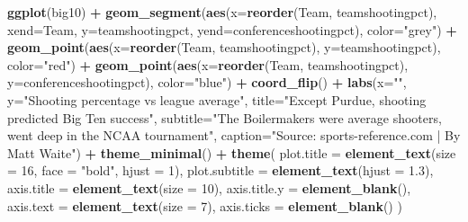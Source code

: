 \documentclass[]{book}
\newenvironment{Shaded}{\begin{snugshade}}{\end{snugshade}}
\newcommand{\KeywordTok}[1]{\textcolor[rgb]{0.13,0.29,0.53}{\textbf{#1}}}
\newcommand{\DataTypeTok}[1]{\textcolor[rgb]{0.13,0.29,0.53}{#1}}
\newcommand{\DecValTok}[1]{\textcolor[rgb]{0.00,0.00,0.81}{#1}}
\newcommand{\FloatTok}[1]{\textcolor[rgb]{0.00,0.00,0.81}{#1}}
\newcommand{\StringTok}[1]{\textcolor[rgb]{0.31,0.60,0.02}{#1}}
\newcommand{\OperatorTok}[1]{\textcolor[rgb]{0.81,0.36,0.00}{\textbf{#1}}}
\newcommand{\NormalTok}[1]{#1}
\begin{document}
\begin{Shaded}
\begin{Highlighting}[]
\KeywordTok{ggplot}\NormalTok{(big10) }\OperatorTok{+}
\StringTok{  }\KeywordTok{geom_segment}\NormalTok{(}\KeywordTok{aes}\NormalTok{(}\DataTypeTok{x=}\KeywordTok{reorder}\NormalTok{(Team, teamshootingpct), }\DataTypeTok{xend=}\NormalTok{Team, }\DataTypeTok{y=}\NormalTok{teamshootingpct, }\DataTypeTok{yend=}\NormalTok{conferenceshootingpct), }\DataTypeTok{color=}\StringTok{"grey"}\NormalTok{) }\OperatorTok{+}\StringTok{ }
\StringTok{  }\KeywordTok{geom_point}\NormalTok{(}\KeywordTok{aes}\NormalTok{(}\DataTypeTok{x=}\KeywordTok{reorder}\NormalTok{(Team, teamshootingpct), }\DataTypeTok{y=}\NormalTok{teamshootingpct), }\DataTypeTok{color=}\StringTok{"red"}\NormalTok{) }\OperatorTok{+}\StringTok{ }
\StringTok{  }\KeywordTok{geom_point}\NormalTok{(}\KeywordTok{aes}\NormalTok{(}\DataTypeTok{x=}\KeywordTok{reorder}\NormalTok{(Team, teamshootingpct), }\DataTypeTok{y=}\NormalTok{conferenceshootingpct), }\DataTypeTok{color=}\StringTok{"blue"}\NormalTok{) }\OperatorTok{+}
\StringTok{  }\KeywordTok{coord_flip}\NormalTok{() }\OperatorTok{+}
\StringTok{   }\KeywordTok{labs}\NormalTok{(}\DataTypeTok{x=}\StringTok{""}\NormalTok{, }\DataTypeTok{y=}\StringTok{"Shooting percentage vs league average"}\NormalTok{, }\DataTypeTok{title=}\StringTok{"Except Purdue, shooting predicted Big Ten success"}\NormalTok{, }\DataTypeTok{subtitle=}\StringTok{"The Boilermakers were average shooters, went deep in the NCAA tournament"}\NormalTok{, }\DataTypeTok{caption=}\StringTok{"Source: sports-reference.com | By Matt Waite"}\NormalTok{) }\OperatorTok{+}
\StringTok{  }\KeywordTok{theme_minimal}\NormalTok{() }\OperatorTok{+}\StringTok{ }
\StringTok{  }\KeywordTok{theme}\NormalTok{(}
    \DataTypeTok{plot.title =} \KeywordTok{element_text}\NormalTok{(}\DataTypeTok{size =} \DecValTok{16}\NormalTok{, }\DataTypeTok{face =} \StringTok{"bold"}\NormalTok{, }\DataTypeTok{hjust =} \DecValTok{1}\NormalTok{),}
    \DataTypeTok{plot.subtitle =} \KeywordTok{element_text}\NormalTok{(}\DataTypeTok{hjust =} \FloatTok{1.3}\NormalTok{),}
    \DataTypeTok{axis.title =} \KeywordTok{element_text}\NormalTok{(}\DataTypeTok{size =} \DecValTok{10}\NormalTok{),}
    \DataTypeTok{axis.title.y =} \KeywordTok{element_blank}\NormalTok{(),}
    \DataTypeTok{axis.text =} \KeywordTok{element_text}\NormalTok{(}\DataTypeTok{size =} \DecValTok{7}\NormalTok{),}
    \DataTypeTok{axis.ticks =} \KeywordTok{element_blank}\NormalTok{()}
\NormalTok{  )}
\end{Highlighting}
\end{Shaded}
\end{document}
